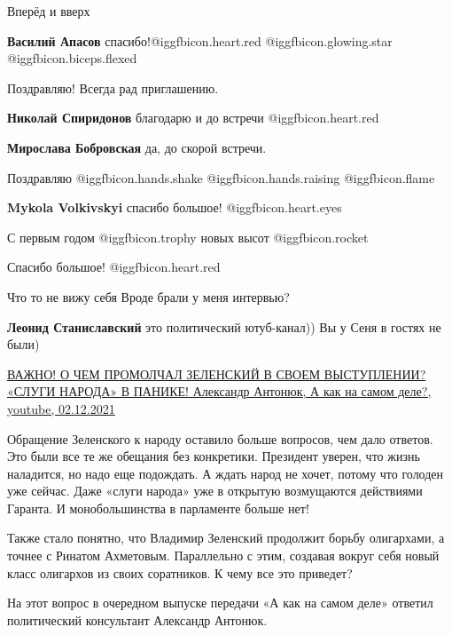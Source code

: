 \begin{itemize}
Вперёд и вверх

\textbf{Василий Апасов} спасибо!@igg{fbicon.heart.red} @igg{fbicon.glowing.star}  @igg{fbicon.biceps.flexed} 

Поздравляю! Всегда рад приглашению.


\textbf{Николай Спиридонов} благодарю и до встречи @igg{fbicon.heart.red}

\textbf{Мирослава Бобровская} да, до скорой встречи.


Поздравляю  @igg{fbicon.hands.shake}  @igg{fbicon.hands.raising}  @igg{fbicon.flame} 

\textbf{Mykola Volkivskyi} спасибо большое! @igg{fbicon.heart.eyes} 

С первым годом  @igg{fbicon.trophy} новых высот  @igg{fbicon.rocket} 

Спасибо большое! @igg{fbicon.heart.red}

Что то не вижу себя
Вроде брали у меня интервью?

\begin{itemize} %
\textbf{Леонид Станиславский} это политический ютуб-канал)) Вы у Сеня в гостях не были)

\href{https://youtu.be/h4fdx83Bpvs}{%
ВАЖНО! О ЧЕМ ПРОМОЛЧАЛ ЗЕЛЕНСКИЙ В СВОЕМ ВЫСТУПЛЕНИИ? «СЛУГИ НАРОДА» В ПАНИКЕ! Александр Антонюк, %
А как на самом деле?, youtube, 02.12.2021%
}

\begin{multicols}{2}

Обращение Зеленского к народу оставило больше вопросов, чем дало ответов. Это
были все те же обещания без конкретики. Президент уверен, что жизнь наладится,
но надо еще подождать. А ждать народ не хочет, потому что голоден уже сейчас.
Даже «слуги народа» уже в открытую возмущаются действиями Гаранта. И
монобольшинства в парламенте больше нет!

Также стало понятно, что Владимир Зеленский продолжит борьбу  олигархами, а
точнее с Ринатом Ахметовым. Параллельно с этим, создавая вокруг себя новый
класс олигархов из своих соратников. К чему все это приведет?

На этот вопрос в очередном выпуске передачи «А как на самом деле» ответил
политический консультант Александр Антонюк.


\end{multicols}
\end{itemize}
\end{itemize}
